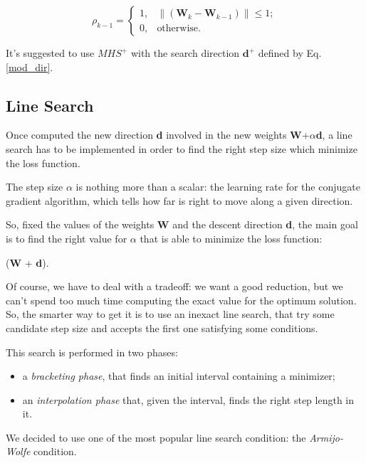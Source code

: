 			\begin{equation}
			\label{rho}
			  \rho_{k-1} =\begin{cases}
			    1 , & \|(\textbf{W}_k - \textbf{W}_{k-1})\| \leq 1;\\
			    0 , & \text{otherwise.}
			  \end{cases}
			\end{equation}

			It's suggested to use $MHS^+$ with the search direction $\textbf{d}^+$ defined by Eq.\ref{mod_dir}.




		\subsection{Line Search} %
		\label{sub:line_search}
			Once computed the new direction \textbf{d} involved in the new weights \textbf{W}+$\alpha$\textbf{d}, a line search has to be implemented in order to find the right step size which minimize the loss function.

			The step size $\alpha$ is nothing more than a scalar: the learning rate for the conjugate gradient algorithm, which tells how far is right to move along a given direction.

			So, fixed the values of the weights \textbf{W} and the descent direction \textbf{d}, the main goal is to find the right value for $\alpha$ that is able to minimize the loss function:

			 \begin{mini}
			   {\alpha}{(\textbf{W} + \alpha\textbf{d}).}{}{}
			 \end{mini}

			Of course, we have to deal with a tradeoff: we want a good reduction, but we can't spend too much time computing the exact value for the optimum solution. So, the smarter way to get it is to use an inexact line search, that try some candidate step size and accepts the first one satisfying some conditions.

			This search is performed in two phases:
			\begin{itemize}
			\item a \textit{bracketing phase}, that finds an initial interval containing a minimizer;
			\item an \textit{interpolation phase} that, given the interval, finds the right step length in it.
			\end{itemize}

			We decided to use one of the most popular line search condition: the \textit{Armijo-Wolfe} condition.

